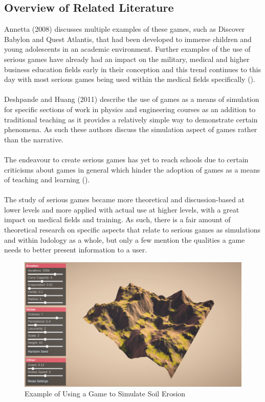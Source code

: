 \subsection{Overview of Related Literature}
Annetta (2008) discusses multiple examples of these games, such as Discover Babylon and Quest Atlantis, that had been developed to immerse children and young adolescents in an academic environment. Further examples of the use of serious games have already had an impact on the military, medical and higher business education fields early in their conception and this trend continues to this day with most serious games being used within the medical fields specifically (\cite{Annetta2008}).
\\\\
Deshpande and Huang (2011) describe the use of games as a means of simulation for specific sections of work in physics and engineering courses as an addition to traditional teaching as it provides a relatively simple way to demonstrate certain phenomena. As such these authors discuss the simulation aspect of games rather than the narrative.
\\\\
The endeavour to create serious games has yet to reach schools due to certain criticisms about games in general which hinder the adoption of games as a means of teaching and learning (\cite{Virvou2005}).
\\\\
The study of serious games became more theoretical and discussion-based at lower levels and more applied with actual use at higher levels, with a great impact on medical fields and training. As such, there is a fair amount of theoretical research on specific aspects that relate to serious games as simulations and within ludology as a whole, but only a few mention the qualities a game needs to better present information to a user. 

\begin{figure}[H]
\centering
\includegraphics[scale=0.4]{soil}
\caption{Example of Using a Game to Simulate Soil Erosion}
\end{figure}

